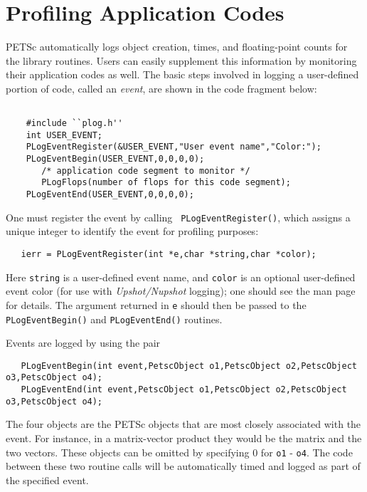 \section{Profiling Application Codes}
\label{sec:profileuser}

PETSc automatically logs object creation, times, and floating-point
counts for the library routines. Users can easily supplement
this information by monitoring their application codes as well.  
The basic steps involved in logging a
user-defined portion of code, called an {\em event}, are shown in the 
code fragment below:
\begin{verbatim}

    #include ``plog.h''
    int USER_EVENT;
    PLogEventRegister(&USER_EVENT,"User event name","Color:");
    PLogEventBegin(USER_EVENT,0,0,0,0);
       /* application code segment to monitor */
       PLogFlops(number of flops for this code segment);
    PLogEventEnd(USER_EVENT,0,0,0,0);

\end{verbatim}

One must register the event by calling {\tt
PLogEventRegister()}, which assigns a unique integer to identify the
event for profiling purposes: 
\begin{verbatim}
   ierr = PLogEventRegister(int *e,char *string,char *color);
\end{verbatim}
Here {\tt string} is a user-defined event name, and {\tt color} is an
optional user-defined event color (for use with {\em Upshot/Nupshot} logging);
one should see the man page for details.  The argument returned in {\tt e} should then
be passed to the {\tt PLogEventBegin()} and {\tt PLogEventEnd()}
routines.

Events are logged by using the pair 
\begin{verbatim}
   PLogEventBegin(int event,PetscObject o1,PetscObject o2,PetscObject o3,PetscObject o4);
   PLogEventEnd(int event,PetscObject o1,PetscObject o2,PetscObject o3,PetscObject o4);
\end{verbatim}
The 
four objects are the PETSc objects that are most closely associated 
with the event.  For instance, in a matrix-vector product they 
would be the matrix and the two vectors.  These objects can be omitted
by specifying 0 for {\tt o1} - {\tt o4}.  The code between these 
two routine calls will be automatically timed and logged as part of the
specified event.

